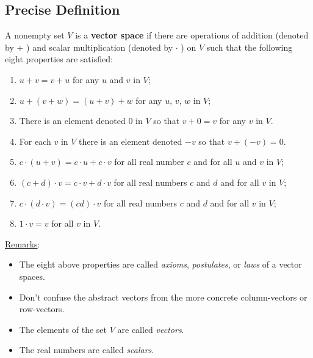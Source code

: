 \documentclass[12pt,a4paper]{article}
\begin{document}
	\subsection{Precise Definition}
	A nonempty set $V$ is a \textbf{vector space} if there are operations of addition (denoted by $+$ ) and scalar multiplication (denoted by $\cdot$ ) on $V$ such that the following eight properties are satisfied:
		\begin{enumerate}
		\item $u + v = v + u$ for any $u$ and $v$ in $V$;
		\item $u + (v + w) = (u + v) + w$ for any $u$, $v$, $w$ in $V$;
		\item There is an element denoted $0$ in $V$ so that $v + 0 = v$ for any $v$ in $V$.
		\item For each $v$ in $V$ there is an element denoted $-v$ so that $v + (-v) = 0$.
		\item $c \cdot (u + v) = c\cdot u + c \cdot v$ for all real number $c$ and for all $u$ and $v$ in $V$;
		\item $(c + d) \cdot v = c\cdot v + d\cdot v$ for all real numbers $c$ and $d$ and for all $v$ in $V$;
		\item $c \cdot (d\cdot v) = (cd) \cdot v$ for all real numbers $c$ and $d$ and for all $v$ in $V$;
		\item $1\cdot v = v$ for all $v$ in $V$.
		\end{enumerate}
		
	\noindent\underline{Remarks}:
		\begin{itemize}
		\item The eight above properties are called \textit{axioms}, \textit{postulates}, or \textit{laws} of a vector spaces.
		\item Don't confuse the abstract vectors from the more concrete column-vectors or row-vectors.
		\item The elements of the set $V$ are called \textit{vectors}.
		\item The real numbers are called \textit{scalars}.
		\end{itemize}
		
\end{document}

